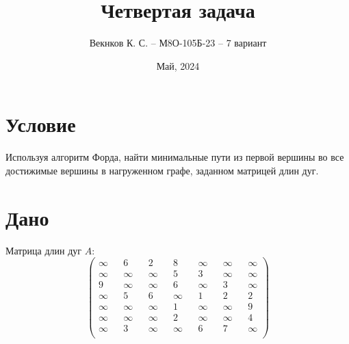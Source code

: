 \documentclass{article}
\title{Четвертая задача}
\author{Векнков К. С. -- М8О-105Б-23 -- 7 вариант}
\date{Май, 2024}
\begin{document}
\setcounter{page}{10}
\maketitle
\section*{Условие}
Используя алгоритм Форда, найти минимальные пути из первой вершины во все
достижимые вершины в нагруженном графе, заданном матрицей длин дуг.
\section*{Дано}
Матрица длин дуг $A$:
$$
\begin{pmatrix}
    \infty && 6      && 2       && 8      && \infty && \infty && \infty \\
    \infty && \infty && \infty  && 5      && 3      && \infty && \infty \\
    9      && \infty && \infty  && 6      && \infty && 3      && \infty \\
    \infty && 5      && 6       && \infty && 1      && 2      && 2      \\
    \infty && \infty && \infty  && 1      && \infty && \infty && 9      \\
    \infty && \infty && \infty  && 2      && \infty && \infty && 4      \\
    \infty && 3      && \infty  && \infty && 6      && 7      && \infty \\
    
\end{pmatrix}
$$
\end{document}
